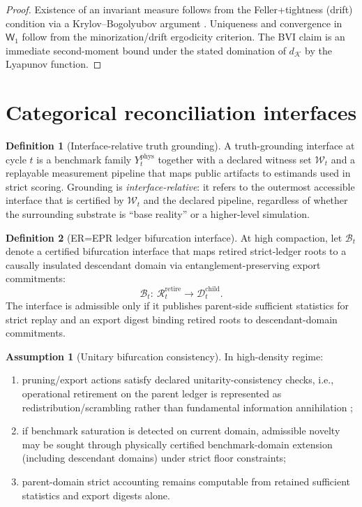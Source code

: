 \documentclass[11pt,a4paper]{article}
\theoremstyle{definition}
\newtheorem{definition}{Definition}
\newtheorem{assumption}{Assumption}
\theoremstyle{remark}
\begin{document}
\begin{proof}


Existence of an invariant measure follows from the Feller+tightness (drift) condition via a Krylov--Bogolyubov argument \cite{Hairer2021Convergence}.
Uniqueness and convergence in $\mathsf W_1$ follow from the minorization/drift ergodicity criterion.
The BVI claim is an immediate second-moment bound under the stated domination of $d_{\mathcal K}$ by the Lyapunov function.
\end{proof}


\section{Categorical reconciliation interfaces}
\begin{definition}[Interface-relative truth grounding]\label{def:interface_relative_truth_grounding}
A truth-grounding interface at cycle $t$ is a benchmark family $Y^{\mathrm{phys}}_t$ together with a declared witness set $\mathcal W_t$ and a replayable measurement pipeline that maps public artifacts to estimands used in strict scoring.
Grounding is \emph{interface-relative}: it refers to the outermost accessible interface that is certified by $\mathcal W_t$ and the declared pipeline, regardless of whether the surrounding substrate is ``base reality'' or a higher-level simulation.
\end{definition}

\begin{definition}[ER=EPR ledger bifurcation interface]\label{def:er_epr_ledger_bifurcation_interface}
At high compaction, let $\mathcal B_t$ denote a certified bifurcation interface that maps retired strict-ledger roots to a causally insulated descendant domain via entanglement-preserving export commitments:
\[
\mathcal B_t:\ \mathcal R_t^{\mathrm{retire}}\longrightarrow \mathcal D_t^{\mathrm{child}}.
\]
The interface is admissible only if it publishes parent-side sufficient statistics for strict replay and an export digest binding retired roots to descendant-domain commitments.
\end{definition}

\begin{assumption}[Unitary bifurcation consistency]\label{ass:bifurcate}
In high-density regime:
\begin{enumerate}
  \item pruning/export actions satisfy declared unitarity-consistency checks, i.e., operational retirement on the parent ledger is represented as redistribution/scrambling rather than fundamental information annihilation \cite{MaldacenaSusskind2013,Almheiri2019,Penington2020};
  \item if benchmark saturation is detected on current domain, admissible novelty may be sought through physically certified benchmark-domain extension (including descendant domains) under strict floor constraints;
  \item parent-domain strict accounting remains computable from retained sufficient statistics and export digests alone.
\end{enumerate}
\end{assumption}
\end{document}
